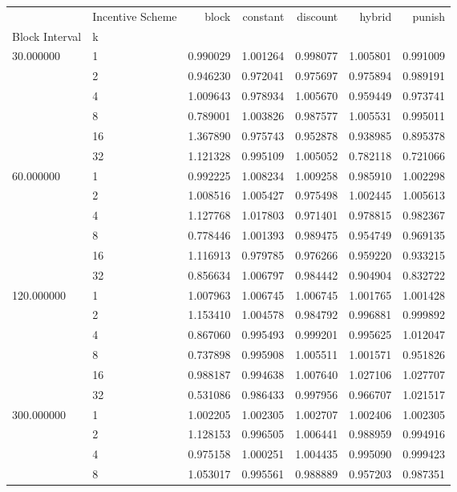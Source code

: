 \begin{tabular}{llrrrrr}
 & Incentive Scheme & block & constant & discount & hybrid & punish \\
Block Interval & k &  &  &  &  &  \\
\multirow[c]{6}{*}{30.000000} & 1 & 0.990029 & 1.001264 & 0.998077 & 1.005801 & 0.991009 \\
 & 2 & 0.946230 & 0.972041 & 0.975697 & 0.975894 & 0.989191 \\
 & 4 & 1.009643 & 0.978934 & 1.005670 & 0.959449 & 0.973741 \\
 & 8 & 0.789001 & 1.003826 & 0.987577 & 1.005531 & 0.995011 \\
 & 16 & 1.367890 & 0.975743 & 0.952878 & 0.938985 & 0.895378 \\
 & 32 & 1.121328 & 0.995109 & 1.005052 & 0.782118 & 0.721066 \\
\multirow[c]{6}{*}{60.000000} & 1 & 0.992225 & 1.008234 & 1.009258 & 0.985910 & 1.002298 \\
 & 2 & 1.008516 & 1.005427 & 0.975498 & 1.002445 & 1.005613 \\
 & 4 & 1.127768 & 1.017803 & 0.971401 & 0.978815 & 0.982367 \\
 & 8 & 0.778446 & 1.001393 & 0.989475 & 0.954749 & 0.969135 \\
 & 16 & 1.116913 & 0.979785 & 0.976266 & 0.959220 & 0.933215 \\
 & 32 & 0.856634 & 1.006797 & 0.984442 & 0.904904 & 0.832722 \\
\multirow[c]{6}{*}{120.000000} & 1 & 1.007963 & 1.006745 & 1.006745 & 1.001765 & 1.001428 \\
 & 2 & 1.153410 & 1.004578 & 0.984792 & 0.996881 & 0.999892 \\
 & 4 & 0.867060 & 0.995493 & 0.999201 & 0.995625 & 1.012047 \\
 & 8 & 0.737898 & 0.995908 & 1.005511 & 1.001571 & 0.951826 \\
 & 16 & 0.988187 & 0.994638 & 1.007640 & 1.027106 & 1.027707 \\
 & 32 & 0.531086 & 0.986433 & 0.997956 & 0.966707 & 1.021517 \\
\multirow[c]{6}{*}{300.000000} & 1 & 1.002205 & 1.002305 & 1.002707 & 1.002406 & 1.002305 \\
 & 2 & 1.128153 & 0.996505 & 1.006441 & 0.988959 & 0.994916 \\
 & 4 & 0.975158 & 1.000251 & 1.004435 & 0.995090 & 0.999423 \\
 & 8 & 1.053017 & 0.995561 & 0.988889 & 0.957203 & 0.987351 \\

\end{tabular}
